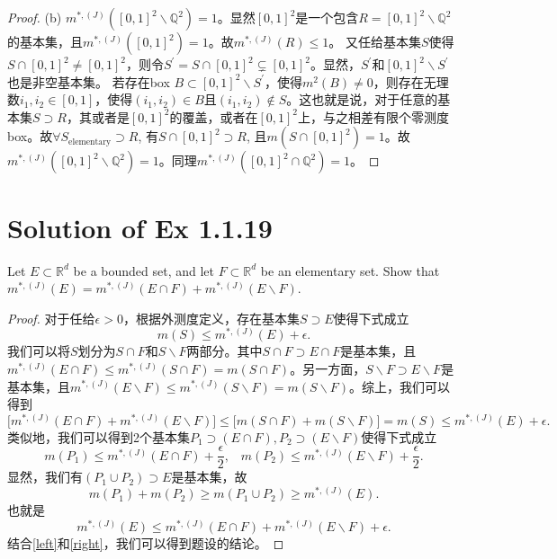 \documentclass[reqno,a4paper,14pt]{amsart}
\begin{document}
\begin{proof}
    (b) $m^{*,(J)}([0,1]^2\backslash \mathbb{Q}^2)=1$。显然$[0,1]^2$是一个包含$R=[0,1]^2\backslash \mathbb{Q}^2$的基本集，且$m^{*,(J)}([0,1]^2)=1$。故$m^{*,(J)}(R)\leq 1$。
    又任给基本集$S$使得$S\cap [0,1]^2\neq [0,1]^2$，则令$S^\prime=S\cap [0,1]^2\subsetneq [0,1]^2$。显然，$S^\prime$和$[0,1]^2\backslash S^\prime$也是非空基本集。
    若存在box $B\subset [0,1]^2\backslash S^\prime$，使得$m^2(B)\neq 0$，则存在无理数$i_1,i_2\in [0,1]$，使得$(i_1,i_2)\in B$且$(i_1,i_2)\notin S$。这也就是说，对于任意的基本集$S\supset R$，其或者是$[0,1]^2$的覆盖，或者在$[0,1]^2$上，与之相差有限个零测度box。故$\forall  S_{\mathrm{elementary}}\supset R$, 有$S\cap [0,1]^2\supset R$, 且$m(S\cap [0,1]^2)=1$。故$m^{*,(J)}([0,1]^2\backslash \mathbb{Q}^2)=1$。同理$m^{*,(J)}([0,1]^2\cap \mathbb{Q}^2)=1$。
\end{proof}

\section{Solution of Ex 1.1.19}
Let $E\subset \mathbb{R}^d$ be a bounded set, and let $F\subset \mathbb{R}^d$ be an elementary set. Show that $m^{*,(J)}(E)=m^{*,(J)}(E\cap F)+m^{*,(J)}(E\backslash F)$.\\
\begin{proof}
    对于任给$\epsilon>0$，根据外测度定义，存在基本集$S\supset E$使得下式成立
    \begin{equation*}
        m(S)\leq m^{*,(J)}(E)+\epsilon.
    \end{equation*}
    我们可以将$S$划分为$S\cap F$和$S\backslash F$两部分。其中$S\cap F\supset E\cap F$是基本集，且$m^{*,(J)}(E\cap F)\leq m^{*,(J)}(S\cap F)=m(S\cap F)$。另一方面，$S\backslash F\supset E\backslash F$是基本集，且$m^{*,(J)}(E\backslash F)\leq m^{*,(J)}(S\backslash F)=m(S\backslash F)$。综上，我们可以得到
    \begin{equation}
        \biggl[m^{*,(J)}(E\cap F)+m^{*,(J)}(E\backslash F)\biggr]\leq \biggl[m(S\cap F)+m(S\backslash F)\biggr]=m(S)\leq m^{*,(J)}(E)+\epsilon.
        \label{right}
    \end{equation}
    类似地，我们可以得到2个基本集$P_1\supset (E\cap F),P_2\supset (E\backslash F)$使得下式成立
    \begin{equation*}
        m(P_1)\leq m^{*,(J)}(E\cap F)+\frac{\epsilon}{2},\;\;\; m(P_2)\leq m^{*,(J)}(E\backslash F)+\frac{\epsilon}{2}.
    \end{equation*}
    显然，我们有$(P_1\cup P_2)\supset E$是基本集，故
    \begin{equation*}
        m(P_1)+m(P_2)\geq m(P_1\cup P_2)\geq m^{*,(J)}(E).
    \end{equation*}
    也就是
    \begin{equation}
        m^{*,(J)}(E)\leq m^{*,(J)}(E\cap F)+m^{*,(J)}(E\backslash F)+\epsilon.
        \label{left}
    \end{equation}
    结合\eqref{left}和\eqref{right}，我们可以得到题设的结论。
\end{proof}
\end{document}
